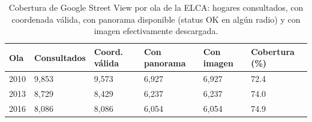 \begin{table}
\caption{Cobertura de Google Street View por ola de la ELCA: hogares consultados, con coordenada válida, con panorama disponible (status OK en algún radio) y con imagen efectivamente descargada.}
\label{tab:gsv_cobertura_ola}
\begin{tabular}{llllll}
\toprule
Ola & Consultados & Coord. válida & Con panorama & Con imagen & Cobertura (\%) \\
\midrule
2010 & 9,853 & 9,573 & 6,927 & 6,927 & 72.4 \\
2013 & 8,729 & 8,429 & 6,237 & 6,237 & 74.0 \\
2016 & 8,086 & 8,086 & 6,054 & 6,054 & 74.9 \\
\bottomrule
\end{tabular}
\end{table}
